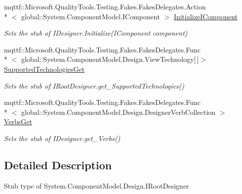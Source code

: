 \begin{DoxyCompactItemize}
mqttf\-::\-Microsoft.\-Quality\-Tools.\-Testing.\-Fakes.\-Fakes\-Delegates.\-Action\\*
$<$ global\-::\-System.\-Component\-Model.\-I\-Component $>$ \hyperlink{class_system_1_1_component_model_1_1_design_1_1_fakes_1_1_stub_i_root_designer_a49ed8935f8f58d52b224edd3f7c7d567}{Initialize\-I\-Component}
\begin{DoxyCompactList}\small\item\em Sets the stub of I\-Designer.\-Initialize(\-I\-Component component)\end{DoxyCompactList}\item 
mqttf\-::\-Microsoft.\-Quality\-Tools.\-Testing.\-Fakes.\-Fakes\-Delegates.\-Func\\*
$<$ global\-::\-System.\-Component\-Model.\-Design.\-View\-Technology\mbox{[}$\,$\mbox{]}$>$ \hyperlink{class_system_1_1_component_model_1_1_design_1_1_fakes_1_1_stub_i_root_designer_a19cc9b841a7eb184e7c761880d6df801}{Supported\-Technologies\-Get}
\begin{DoxyCompactList}\small\item\em Sets the stub of I\-Root\-Designer.\-get\-\_\-\-Supported\-Technologies()\end{DoxyCompactList}\item 
mqttf\-::\-Microsoft.\-Quality\-Tools.\-Testing.\-Fakes.\-Fakes\-Delegates.\-Func\\*
$<$ global\-::\-System.\-Component\-Model.\-Design.\-Designer\-Verb\-Collection $>$ \hyperlink{class_system_1_1_component_model_1_1_design_1_1_fakes_1_1_stub_i_root_designer_ad1676704e20a8d8dc33fb1d6f48ff31a}{Verbs\-Get}
\begin{DoxyCompactList}\small\item\em Sets the stub of I\-Designer.\-get\-\_\-\-Verbs()\end{DoxyCompactList}\end{DoxyCompactItemize}


\subsection{Detailed Description}
Stub type of System.\-Component\-Model.\-Design.\-I\-Root\-Designer



